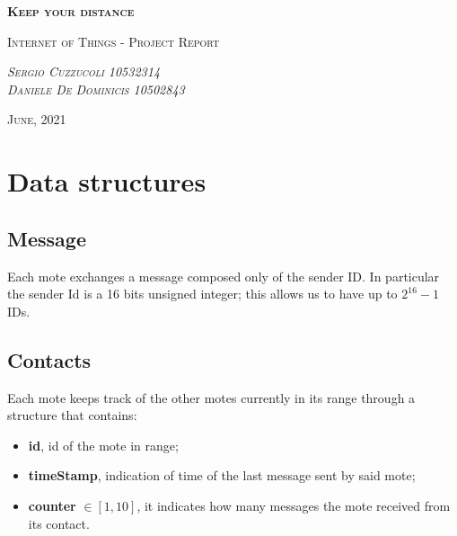 \documentclass[12pt]{article}
\begin{document}
\begin{titlepage}
	\centering
	{\scshape\Huge\textbf{Keep your distance}\par}
	\vspace{1cm}
	\vspace{1cm}

	{\scshape\Large Internet of Things - Project Report\par}
	\vspace{2cm}
	{\scshape\Large\emph{Sergio Cuzzucoli 10532314}\\ \emph{Daniele De Dominicis 10502843}\par}
	\vspace{4cm}
	{\scshape\normalsize{June, 2021}}
\end{titlepage}


\section{Data structures}

\subsection{Message}
Each mote exchanges a message composed only of the sender ID. In particular the sender Id is a 16 bits unsigned integer; this allows us to have up to \(2^{16}-1\) IDs.

\subsection{Contacts}
Each mote keeps track of the other motes currently in its range through a structure that contains:
\begin{itemize}
  \item \textbf{id}, id of the mote in range;
  \item \textbf{timeStamp}, indication of time of the last message sent by said mote;
  \item \textbf{counter}  $\in [1,10]$, it indicates how many messages the mote received from its contact.
\end{itemize}
\end{document}
